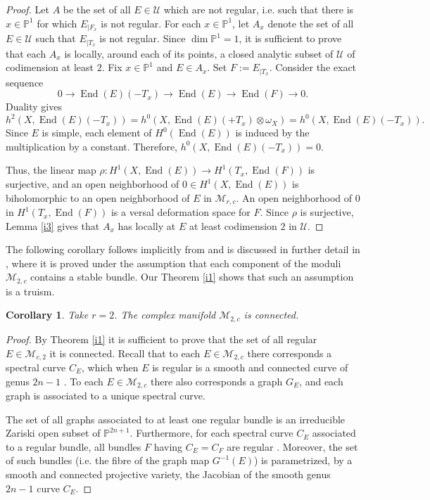 \documentclass[letterpaper,10pt]{amsart}
\theoremstyle{plain}
\newtheorem{corollary}[theorem]{Corollary}
\theoremstyle{definition}
\newcommand{\enm}[1]{\ensuremath{#1}}          %
\newcommand{\op}[1]{\operatorname{#1}}
\newcommand{\cal}[1]{\mathcal{#1}}
\newcommand{\PP}{\enm{\mathbb{P}}}
\newcommand{\Mm}{\enm{\cal{M}}}
\newcommand{\Uu}{\enm{\cal{U}}}
\newcommand{\End}{\op{End}}
\renewcommand{\to}[1][]{\xrightarrow{\ #1\ }}
\begin{document}
\begin{proof}
Let $A$ be the set of all $E\in \Uu$ which are not regular, i.e. such that there is $x\in \PP^1$ for which $E_{|F_x}$ is not regular. For each $x\in \PP^1$, let  $A_x$ denote the set of all $E\in \Uu$ such that $E_{|T_x}$ is not regular.
Since $\dim \PP^1 =1$, it is sufficient to prove that each $A_x$ is locally, around each of its points,
 a closed analytic subset of $\Uu$ of codimension at least
$2$. Fix $x\in \PP^1$ and $E\in A_x$. Set $F:= E_{|T_x}$. Consider the exact sequence
\begin{equation}\label{eqd1}
0\to \End(E)(-T_x)\to \End(E)\to \End(F)\to 0 \text{.}
\end{equation}
Duality gives $$h^2(X,\End(E)(-T_x)) =h^0(X,\End(E)(+T_x)\otimes \omega_X) = h^0(X,\End(E)(-T_x)).$$ 
Since $E$ is simple, each element of $H^0(\End(E))$ is induced by the multiplication by a constant. Therefore, $h^0(X,\End(E)(-T_x))=0$.

Thus, the linear map $\rho\colon H^1(X,\End(E))\to H^1(T_x,\End(F))$ is surjective, and an open neighborhood
 of $0\in H^1(X,\End(E))$ is biholomorphic to an open neighborhood of $E$ in $\Mm_{r,c}$. An open neighborhood of $0$ in $H^1(T_x,\End(F))$ is a versal deformation space for $F$. Since $\rho$ is surjective, Lemma \ref{i3} gives that 
$A_x$ has locally at $E$ at least codimension $2$ in $\Uu$.
\end{proof}

The following corollary follows implicitly from  \cite{BH} and is discussed in further detail in \cite{G}, 
where it is proved under the assumption that each component of the moduli $\mathcal M_{2,c}$
contains a stable bundle. Our Theorem \ref{i1} shows that such an assumption is a truism.


\begin{corollary}\label{i2}
Take $r=2$. The complex manifold $\Mm_{2,c}$ is connected.
\end{corollary}

\begin{proof}
By Theorem \ref{i1} it is sufficient to prove that the set of all regular $E\in \Mm_{c,2}$ it is connected. 
Recall that to each  $E\in \Mm_{2,c}$ there corresponds a  spectral curve $C_E$, which 
 when $E$ is regular  is a smooth and connected curve of genus $2n-1$ \cite[Thm.]{BG}.
To each  $E\in \Mm_{2,c}$ there also corresponds a graph $G_E$, and each graph is associated to a unique spectral curve.
 
 The set of all graphs associated to at least one regular bundle is an irreducible Zariski open subset of $\PP^{2n+1}$.
  Furthermore,  for each spectral curve $C_E$ associated to a regular bundle, all bundles $F$ 
  having  $C_E=C_F$ are regular \cite[Lem.]{BG}.
  Moreover,  the set of such bundles (i.e. the fibre of the graph map $G^{-1}(E)$) is
   parametrized, by a smooth and connected projective variety, the Jacobian of the smooth genus $2n-1$ curve $C_E$.
\end{proof}
\end{document}
